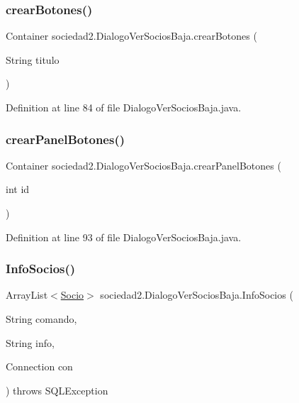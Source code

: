 \subsubsection{\texorpdfstring{crear\+Botones()}{crearBotones()}}
{\footnotesize\ttfamily Container sociedad2.\+Dialogo\+Ver\+Socios\+Baja.\+crear\+Botones (\begin{DoxyParamCaption}\item[{String}]{titulo }\end{DoxyParamCaption})}



Definition at line 84 of file Dialogo\+Ver\+Socios\+Baja.\+java.

\mbox{\label{classsociedad2_1_1_dialogo_ver_socios_baja_a1690764694f81b9b5a5081178fe2ab77}} 
\subsubsection{\texorpdfstring{crear\+Panel\+Botones()}{crearPanelBotones()}}
{\footnotesize\ttfamily Container sociedad2.\+Dialogo\+Ver\+Socios\+Baja.\+crear\+Panel\+Botones (\begin{DoxyParamCaption}\item[{int}]{id }\end{DoxyParamCaption})}



Definition at line 93 of file Dialogo\+Ver\+Socios\+Baja.\+java.

\mbox{\label{classsociedad2_1_1_dialogo_ver_socios_baja_a6e73715c1f88a3649f9b524ca781b8e0}} 
\subsubsection{\texorpdfstring{Info\+Socios()}{InfoSocios()}}
{\footnotesize\ttfamily Array\+List$<$\mbox{\hyperlink{classsociedad2_1_1_socio}{Socio}}$>$ sociedad2.\+Dialogo\+Ver\+Socios\+Baja.\+Info\+Socios (\begin{DoxyParamCaption}\item[{String}]{comando,  }\item[{String}]{info,  }\item[{Connection}]{con }\end{DoxyParamCaption}) throws S\+Q\+L\+Exception}



